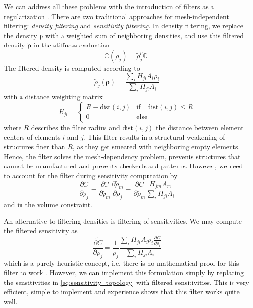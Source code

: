 We can address all these problems with the introduction of filters as a regularization \cite{Harzheim2014, Lazarov2011}. There are two traditional approaches for mesh-independent filtering: \emph{density filtering} and \emph{sensitivity filtering}. In density filtering, we replace the density $\pmb{\rho}$ with a weighted sum of neighboring densities, and use this filtered density $\tilde{\pmb{\rho}}$ in the stiffness evaluation
\begin{equation}
    \mathbb{C}(\rho_j)= \tilde{\rho}_j^p \mathbb{C}.
\end{equation}
The filtered density is computed according to 
\begin{equation}
    \tilde{\rho}_j (\pmb{\rho}) = \frac{\sum_i H_{ji} A_i \rho_i}{\sum_i H_{ji} A_i}
\end{equation}
with a distance weighting matrix
\begin{equation}
    H_{ji} = 
    \begin{cases}
        R-\textrm{dist}(i,j) & \text{if} \quad \textrm{dist}(i,j) \le R \\
        0 & \text{else},
    \end{cases}
\end{equation}
where $R$ describes the filter radius and $\textrm{dist}(i,j)$ the distance between element centers of elements $i$ and $j$. This filter results in a structural weakening of structures finer than $R$, as they get smeared with neighboring empty elements. Hence, the filter solves the mesh-dependency problem, prevents structures that cannot be manufactured and prevents checkerboard patterns. However, we need to account for the filter during sensitivity computation by 
\begin{equation}
    \frac{\partial C}{\partial \rho_j} 
    = \frac{\partial C}{\partial \tilde{\rho}_m} \frac{\partial \tilde{\rho}_m}{\partial \rho_j}
    = \frac{\partial C}{\partial \tilde{\rho}_m}  \frac{H_{jm} A_m }{\sum_i H_{ji} A_i}
\end{equation}
and in the volume constraint.

An alternative to filtering densities is filtering of sensitivities. We may compute the filtered sensitivity as
\begin{equation}
    \widetilde{\frac{\partial C}{\partial \rho_j}} = \frac{1}{\rho_j} \frac{\sum_i H_{ji} A_i \rho_i \frac{\partial C}{\partial \rho_i} }{\sum_i H_{ji} A_i}
\end{equation}
which is a purely heuristic concept, i.e. there is no mathematical proof for this filter to work \cite{Sigmund1998}. However, we can implement this formulation simply by replacing the sensitivities in \eqref{eq:sensitivity_topology} with filtered sensitivities. This is very efficient, simple to implement and experience shows that this filter works quite well.

